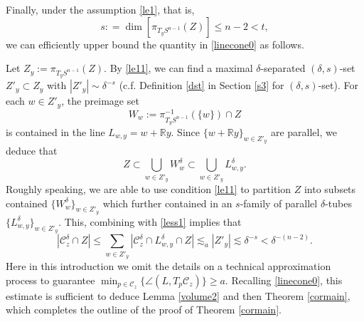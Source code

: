 \documentclass[11pt,a4paper,reqno]{amsart}
\newcommand{\R}{\mathbb{R}}
\newcommand{\calC}{\mathcal{C}}
\newcommand{\1}{\mathbf{1}}
\numberwithin{equation}{section}
\theoremstyle{plain}
\theoremstyle{definition}
\theoremstyle{remark}
\begin{document}
Finally, under the assumption \eqref{le1}, that is,
\begin{equation}\label{le11}
  s : = \dim[\pi_{T_yS^{n-1}}(Z)] \le n-2 < t,
\end{equation}
we can efficiently upper bound the quantity in \eqref{linecone0} as follows.

Let $Z_y:=\pi_{T_yS^{n-1}}(Z)$. By \eqref{le11}, we can find a maximal $\delta$-separated $(\delta,s)$-set $Z'_y \subset Z_y$ with $|Z'_y| \sim \delta^{-s}$ (c.f. Definition \ref{dst} in Section \ref{s3} for $(\delta,s)$-set). For each $w \in Z'_y$, the preimage set
$$W_w:=\pi_{T_yS^{n-1}}^{-1}(\{w\}) \cap Z$$
  is contained in the line $L_{w,y} = w+ \R y$.
Since $\{w+ \R y\}_{w \in Z'_y}$ are parallel, we deduce that
\begin{equation}
  Z \subset \bigcup_{w \in Z'_y} W_w^\delta \subset \bigcup_{w \in Z'_y} L_{w,y}^\delta.
\end{equation}
Roughly speaking, we are able to use condition \eqref{le11} to partition $Z$ into subsets contained $\{W_w^\delta\}_{w \in Z'_y}$ which further contained in an $s$-family of parallel $\delta$-tubes $\{L_{w,y}^\delta\}_{w \in Z'_y}$. This, combining with \eqref{less1} implies that
$$ |\calC_z^\delta \cap Z| \le \sum_{w \in Z'_y} |\calC_z^\delta \cap L_{w,y}^\delta \cap Z| \lesssim_a |Z'_y| \lesssim \delta^{-s} < \delta^{-(n-2)}. $$
Here in this introduction we omit the details on a technical approximation process to guarantee $\min_{p \in \calC_z}\{\angle(L,T_p\calC_z)\}  \ge a$.
Recalling \eqref{linecone0}, this estimate is sufficient to deduce Lemma \ref{volume2} and then Theorem \ref{cormain}, which completes the outline of the proof of Theorem \ref{cormain}.
\end{document}
